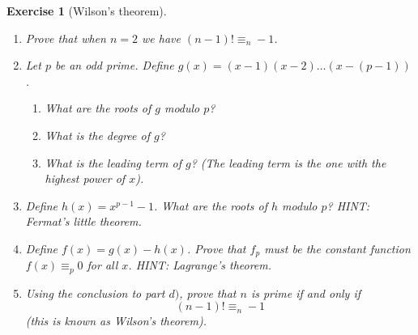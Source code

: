 \documentclass{article}
\theoremstyle{plain}
\newtheorem{Q}{Exercise}{\bfseries}{\upshape}
\begin{document}
\begin{Q}[Wilson's theorem]\mbox{}
\begin{enumerate}
\item[a)] Prove that when $n=2$ we have $(n-1)! \equiv_n -1$. 
\item[b)] Let $p$ be an odd prime. Define $g(x)= (x-1)(x-2)\ldots(x-(p-1))$. 
\begin{enumerate}
\item[i)] What are the roots of $g$ modulo $p$? 
\item[ii)] What is the degree of $g$?
\item[iii)] What is the leading term of $g$? (The leading term is the one with the highest power of $x$).
\end{enumerate} 
\item[c)] Define $h(x)= x^{p-1} -1$. What are the roots of $h$ modulo $p$? HINT: Fermat's little theorem.
\item[d)] Define $f(x) = g(x)- h(x)$. Prove that $f_p$ must be the constant function $f(x)\equiv_ p 0$ for all $x$. HINT: Lagrange's theorem. 
\item[e)] Using the conclusion to part $d)$, prove that $n$ is prime if and only if \[(n-1)! \equiv_n -1\] (this is known as Wilson's theorem).    
\end{enumerate} 
\end{Q}
\begin{comment}
\textbf{Solution:}
\begin{enumerate}[a)]
\item $(2-1)! = 1 \equiv_2 -1$.
\item \begin{enumerate}[i)]
\item The roots are $1,2,3,\ldots, p-1$.
\item The degree of $g$ is $p-1$.
\item The leading term is $x^{p-1}$.
\end{enumerate}
\item The roots of $h$ are $1,2,3\ldots,p-1$ (all numbers between 1 and $p-1$ are coprime with $p$ so we apply Fermat's little theorem).
\item $g$ and $h$ both have degree $p-1$. Also, the leading term of both is $x^{p-1}$. This means that the degree of $f_p$ is at most $p-2$. However, $f_p$ has at least $p-1$ roots, as $g$ and $h$ have $p-1$ roots in common. So Lagrange's theorem tells us that $f_p$ must be the constant zero function modulo $p$, as it has more roots than its degree.
\item Suppose $n=p$ for a prime number $p$. If $p=2$ we already proved the claim in part a), so suppose $p>2$. Then we have proved that $g(x) - h(x) \equiv_p 0$. So in particular we have $g(p) - h(p) \equiv_p 0$. So $(p-1)! +1 \equiv_p 0$. I.e. $(p-1)! \equiv_p -1$. 

Conversely, if $(p-1)! \equiv_p -1$ then $p|((p-1)! +1) $. So, if $q$ is a prime factor of $p$ with $q<p$ then $q|((p-1)! +1)$, and obviously $q|(p-1)!$. So from lemma 1.7 we get $q|1$, but this is impossible. We conclude that $p$ has no prime factors other than itself. I.e. that $p$ is prime.
\end{enumerate}
\end{comment}
\end{document}

